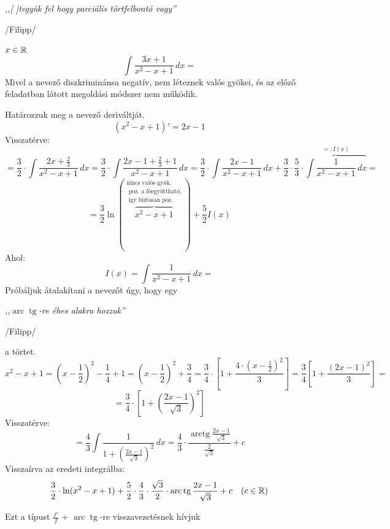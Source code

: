 \documentclass[a4paper,11.5pt]{article}
\makeatletter
\DeclareRobustCommand*{\dots}{%
		\ifmmode\@xp\mdots@\else\@xp\textellipsis\fi}}
\DeclareMathOperator{\tg}{tg}
\DeclareMathOperator{\arc}{arc}
\DeclareMathOperator{\arctg}{arc tg}
\makeatother
\begin{document}
	\begin{center}
		\textit{,,[\dots]tegyük fel hogy parciális törtfelbontó vagy''}
		
		\smallskip
		/Filipp/
	\end{center}
	\begin{task}$x\in\mathbb{R}$
		\[\int\frac{3x+1}{x^2-x+1}\,dx= \]
		Mivel a nevező diszkriminánsa negatív, nem léteznek valós gyökei, és az előző feladatban látott megoldási módszer nem működik.
		
		Határozzuk meg a nevező deriváltját.
		\[ (x^2-x+1)'=2x-1 \]
		Visszatérve:
		\[ =\frac{3}{2}\cdot\int\frac{2x+\frac{2}{3}}{x^2-x+1}\,dx=\frac{3}{2}\cdot\int\frac{2x-1+\frac{2}{3}+1}{x^2-x+1}\,dx=\frac{3}{2}\cdot\int\frac{2x-1}{x^2-x+1}\,dx+\frac{3}{2}\cdot\frac{5}{3}\cdot\overbrace{\int\frac{1}{x^2-x+1}\,dx}^{=:I(x)}= \] 
		\[ =\frac{3}{2}\ln(\overbrace{x^2-x+1}^{\substack{\text{nincs valós gyök,}\\\text{ poz. a főegyüttható,}\\\text{ így biztosan poz.}}})+\frac{5}{2}I(x) \]
		Ahol:
		\[ I(x)=\int\frac{1}{x^2-x+1}\,dx= \]
		Próbáljuk átalakítani a nevezőt úgy, hogy egy \label{husi}
		\begin{center}
			\textit{,,$\arc\tg$-re éhes alakra hozzuk''}
			\smallskip
			
			/Filipp/
		\end{center}
		a törtet.
		\[ x^2-x+1=\left(x-\frac{1}{2}\right)^2-\frac{1}{4}+1=\left(x-\frac{1}{2}\right)^2+\frac{3}{4}= \frac{3}{4}\cdot\left[1+\frac{4\cdot\left(x-\frac{1}{2}\right)^2}{3}\right]=\frac{3}{4}\left[1+\frac{(2x-1)^2}{3}\right]=\]
		\[=\frac{3}{4}\cdot\left[1+\left(\frac{2x-1}{\sqrt{3}}\right)^2\right] \]
		Visszatérve:
		\[ =\frac{4}{3}\int\frac{1}{1+\left(\frac{2x-1}{\sqrt{3}}\right)^2}\,dx=\frac{4}{3} \cdot\frac{\arctg\frac{2x-1}{\sqrt{3}}}{\frac{2}{\sqrt{3}}}+c \]
		Visszaírva az eredeti integrálba:
		\[ \frac{3}{2}\cdot\ln(x^2-x+1)+\frac{5}{2}\cdot\frac{4}{3}\cdot\frac{\sqrt{3}}{2}\cdot\arc\tg\frac{2x-1}{\sqrt{3}}+c\quad (c\in\R) \]
	\end{task}
	\begin{note}
		Ezt a típust $\frac{f'}{f}$ + $\arc\tg$-re visszavezetésnek hívjuk
	\end{note}
\end{document}
